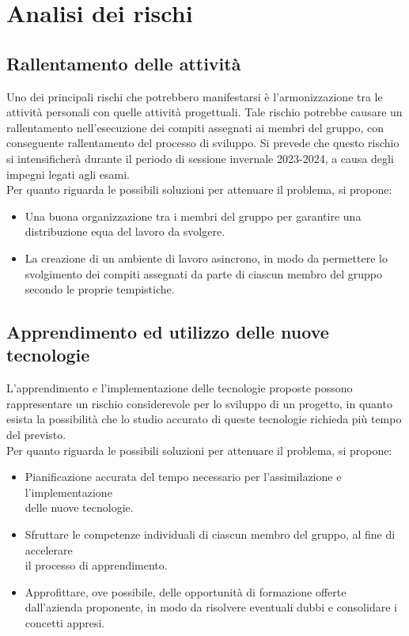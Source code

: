 \documentclass{article}
\begin{document}
\section{Analisi dei rischi}
\subsection{Rallentamento delle attività}
Uno dei principali rischi che potrebbero manifestarsi è l'armonizzazione tra le attività personali con quelle attività progettuali. Tale rischio
potrebbe causare un rallentamento nell'esecuzione dei compiti assegnati ai membri del gruppo, con conseguente rallentamento del processo di sviluppo. 
Si prevede che questo rischio si intensificherà durante il periodo di sessione invernale 2023-2024, a causa degli impegni legati agli esami.\\ 
Per quanto riguarda le possibili soluzioni per attenuare il problema, si propone: 

\begin{itemize}
    \item Una buona organizzazione tra i membri del gruppo per garantire una distribuzione equa del lavoro da svolgere.
    \item La creazione di un ambiente di lavoro asincrono, in modo da permettere lo svolgimento dei compiti assegnati da parte di ciascun membro del gruppo secondo le proprie tempistiche.
\end{itemize}

\subsection{Apprendimento ed utilizzo delle nuove tecnologie}
L’apprendimento e l'implementazione delle tecnologie proposte possono rappresentare un rischio considerevole per lo 
sviluppo di un progetto, in quanto esista la possibilità che lo studio accurato di queste tecnologie richieda più tempo del previsto. \\
Per quanto riguarda le possibili soluzioni per attenuare il problema, si propone:
\begin{itemize}
    \item Pianificazione accurata del tempo necessario per l’assimilazione e l’implementazione \\delle nuove tecnologie.
    \item Sfruttare le competenze individuali di ciascun membro del gruppo, al fine di accelerare \\ il processo di apprendimento.
    \item Approfittare, ove possibile, delle opportunità di formazione offerte dall’azienda proponente, in modo da risolvere eventuali dubbi e consolidare i concetti appresi.
\end{itemize}
\end{document}
